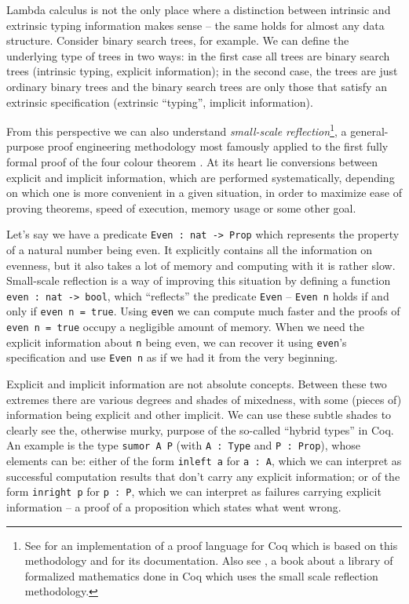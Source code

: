 \documentclass[declaration,mgr,english,shortabstract]{iithesis}
\newcommand{\m}[1]{\texttt{#1}}
\begin{document}
Lambda calculus is not the only place where a distinction between intrinsic and extrinsic typing information makes sense -- the same holds for almost any data structure. Consider binary search trees, for example. We can define the underlying type of trees in two ways: in the first case all trees are binary search trees (intrinsic typing, explicit information); in the second case, the trees are just ordinary binary trees and the binary search trees are only those that satisfy an extrinsic specification (extrinsic ``typing'', implicit information).

From this perspective we can also understand \textit{small-scale reflection}\footnote{See \cite{SSR1} for an implementation of a proof language for Coq which is based on this methodology and \cite{SSR2} for its documentation. Also see \cite{MCB}, a book about a library of formalized mathematics done in Coq which uses the small scale reflection methodology.}, a general-purpose proof engineering methodology most famously applied to the first fully formal proof of the four colour theorem \cite{4CT1} \cite{4CT2}. At its heart lie conversions between explicit and implicit information, which are performed systematically, depending on which one is more convenient in a given situation, in order to maximize ease of proving theorems, speed of execution, memory usage or some other goal.

Let's say we have a predicate \m{Even\ :\ nat -> Prop} which represents the property of a natural number being even. It explicitly contains all the information on evenness, but it also takes a lot of memory and computing with it is rather slow. Small-scale reflection is a way of improving this situation by defining a function \m{even\ :\ nat -> bool}, which ``reflects'' the predicate \m{Even} -- \m{Even n} holds if and only if \m{even n = true}. Using \m{even} we can compute much faster and the proofs of \m{even n = true} occupy a negligible amount of memory. When we need the explicit information about \m{n} being even, we can recover it using \m{even}'s specification and use \m{Even n} as if we had it from the very beginning.

Explicit and implicit information are not absolute concepts. Between these two extremes there are various degrees and shades of mixedness, with some (pieces of) information being explicit and other implicit. We can use these subtle shades to clearly see the, otherwise murky, purpose of the so-called ``hybrid types'' in Coq. An example is the type \m{sumor A P} (with \m{A\ :\ Type} and \m{P\ :\ Prop}), whose elements can be: either of the form \m{inleft a} for \m{a\ :\ A}, which we can interpret as successful computation results that don't carry any explicit information; or of the form \m{inright p} for \m{p\ :\ P}, which we can interpret as failures carrying explicit information -- a proof of a proposition which states what went wrong.
\end{document}

